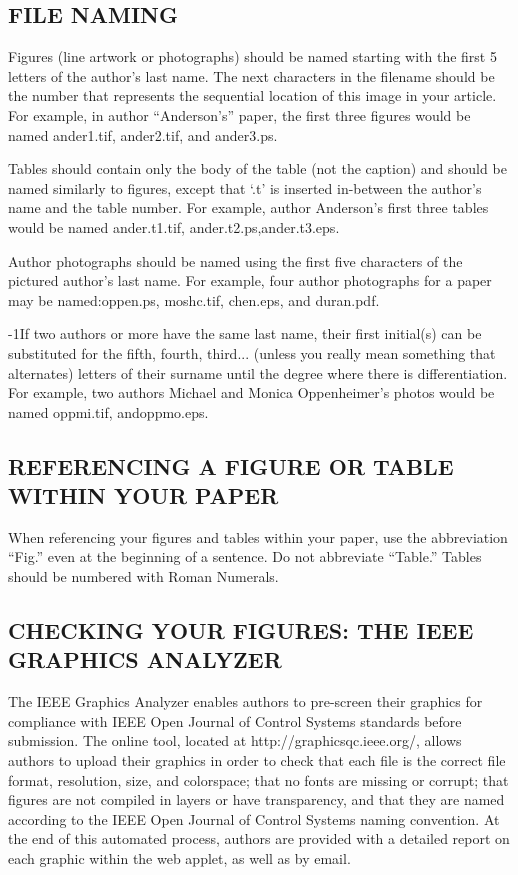 \documentclass{IEEEojcsys}
\begin{document}
\subsection{FILE NAMING}

Figures (line artwork or photographs) should be named starting with the first 5 letters of the author's last name. The next characters in the filename should be the number that represents the sequential location of this image in your article. For example, in author ``Anderson's'' paper, the first three figures would be named ander1.tif, ander2.tif, and ander3.ps.

Tables should contain only the body of the table (not the caption) and should be named similarly to figures, except that `.t' is inserted in-between the author's name and the table number. For example, author Anderson's first three tables would be named ander.t1.tif, ander.t2.ps,\break ander.t3.eps.

Author photographs should be named using the first five characters of the pictured author's last name. For example, four author photographs for a paper may be named:\break oppen.ps, moshc.tif, chen.eps, and duran.pdf.

\looseness-1If two authors or more have the same last name, their first initial(s) can be substituted for the fifth, fourth, third... (unless  you  really  mean  something  that  alternates) letters of their surname until the degree where there is differentiation. For example, two authors Michael and Monica Oppenheimer's photos would be named oppmi.tif, and\break oppmo.eps.

\subsection{REFERENCING A FIGURE OR TABLE WITHIN YOUR PAPER}
 
When referencing your figures and tables within your paper, use the abbreviation ``Fig.'' even at the beginning of a sentence. Do not abbreviate ``Table.'' Tables should be numbered with Roman Numerals.

\subsection{CHECKING YOUR FIGURES: THE IEEE GRAPHICS ANALYZER}

The IEEE Graphics Analyzer enables authors to pre-screen their graphics for compliance with IEEE Open Journal of Control Systems standards before submission. The online tool, located at http://graphicsqc.ieee.org/, allows authors to upload their graphics in order to check that each file is the correct file format, resolution, size, and colorspace; that no fonts are missing or corrupt; that figures are not compiled in layers or have transparency, and that they are named according to the IEEE Open Journal of Control Systems naming convention. At the end of this automated process, authors are provided with a detailed report on each graphic within the web applet, as well as by email.
\end{document}
